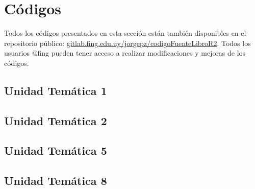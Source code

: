 
\chapter{Códigos}

Todos los códigos presentados en esta sección están también disponibles en el repositorio público:
\href{https://gitlab.fing.edu.uy/jorgepz/codigoFuenteLibroR2}{gitlab.fing.edu.uy/jorgepz/codigoFuenteLibroR2}. %
%
Todos los usuarios @fing pueden tener acceso a realizar modificaciones y mejoras de los códigos.


\section{Unidad Temática 1}




\section{Unidad Temática 2}














\section{Unidad Temática 5} \label{sec:codut5}




\section{Unidad Temática 8}


